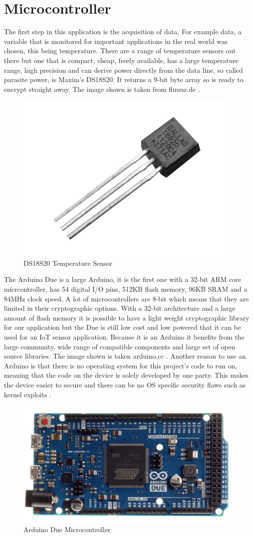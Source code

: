 \section{Microcontroller}

The first step in this application is the acquisition of data. For example data, a variable that is monitored for important applications in the real world was chosen, this being temperature. There are a range of temperature sensors out there but one that is compact, cheap, freely available, has a large temperature range, high precision and can derive power directly from the data line, so called parasite power, is Maxim's DS18S20. It returns a 9-bit byte array so is ready to encrypt straight away. The image shown is taken from fluuuz.de \cite{dsimage}.

\begin{figure}[H]
	\centering
	\includegraphics[width=.4\linewidth]{Figures/ds.jpg}
	\caption{DS18S20 Temperature Sensor}
	\label{fig:ds}
\end{figure}

The Arduino Due is a large Arduino, it is the first one with a 32-bit ARM core micrcontroller, has 54 digital I/O pins, 512KB flash memory, 96KB SRAM and a 84MHz clock speed. A lot of microcontrollers are 8-bit which means that they are limited in their cryptographic options. With a 32-bit architecture and a large amount of flash memory it is possible to have a light weight cryptographic library for our application but the Due is still low cost and low powered that it can be used for an IoT sensor application. Because it is an Arduino it benefits from the large community, wide range of compatible components and large set of open source libraries. The image shown is taken arduino.cc \cite{dueimage}. Another reason to use an Arduino is that there is no operating system for this project's code to run on, meaning that the code on the device is solely developed by one party. This makes the device easier to secure and there can be no OS specific security flaws such as kernel exploits \cite{kernel}.

\begin{figure}[H]
	\centering
	\includegraphics[width=.4\linewidth]{Figures/due.jpg}
	\caption{Arduino Due Microcontroller}
	\label{fig:due}
\end{figure}

